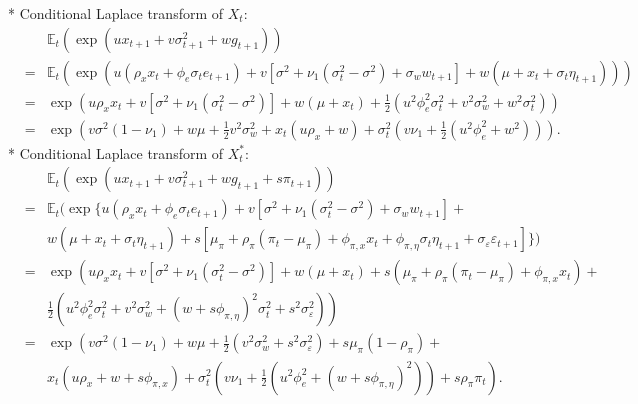 	* Conditional Laplace transform of $X_t$:\hyperlink{slide:BYaffine}{}
	\begin{eqnarray*}
	&& \mathbb{E}_t(\exp(u x_{t+1} + v \sigma^2_{t+1} + w g_{t+1}))\\
	&=& \mathbb{E}_t(\exp(u (\rho_x x_t + \phi_e \sigma_t e_{t+1}) + v [\sigma^2 + \nu_1(\sigma^2_t -\sigma^2) + \sigma_w w_{t+1}] + w (\mu + x_t + \sigma_t \eta_{t+1})))\\
	&=& \exp\left(u \rho_x x_t + v [\sigma^2 + \nu_1(\sigma^2_t -\sigma^2)] + w (\mu + x_t) + \frac{1}{2}(u^2 \phi_e^2 \sigma_t^2+v^2 \sigma_w^2 + w^2 \sigma_t^2) \right)\\
	&=& \exp\left(
	v \sigma^2 (1 - \nu_1) + w \mu + \frac{1}{2}v^2 \sigma_w^2 + x_t(u \rho_x +  w) + \sigma_t^2\left(v \nu_1+ \frac{1}{2}(u^2 \phi_e^2 + w^2)\right)
	\right).
	\end{eqnarray*}
	* Conditional Laplace transform of $X_t^*$:\hyperlink{slide:BYaugment}{}
	\begin{eqnarray*}
	&& \mathbb{E}_t(\exp(u x_{t+1} + v \sigma^2_{t+1} + w g_{t+1} + s \pi_{t+1}))\\
	&=& \mathbb{E}_t(\exp\{u (\rho_x x_t + \phi_e \sigma_t e_{t+1}) + v [\sigma^2 + \nu_1(\sigma^2_t -\sigma^2) + \sigma_w w_{t+1}] + \\
	&& w (\mu + x_t + \sigma_t \eta_{t+1}) +
	s [ \mu_\pi + \rho_{\pi} (\pi_{t} - \mu_\pi) + \phi_{\pi,x} x_{t} + \phi_{\pi,\eta} \sigma_t \eta_{t+1} + \sigma_\varepsilon \varepsilon_{t+1}]\})\\
	&=& \exp\left(u \rho_x x_t + v [\sigma^2 + \nu_1(\sigma^2_t -\sigma^2)] + w (\mu + x_t) + s ( \mu_\pi + \rho_{\pi} (\pi_{t} - \mu_\pi) + \phi_{\pi,x} x_{t}) +  \right. \\
	&& \left. \frac{1}{2}\left(u^2 \phi_e^2 \sigma_t^2+v^2 \sigma_w^2 + (w+s \phi_{\pi,\eta})^2 \sigma_t^2 + s^2 \sigma_\varepsilon^2\right) \right)\\
	&=& \exp\left(
	v \sigma^2 (1 - \nu_1) + w \mu + \frac{1}{2}\left(v^2 \sigma_w^2+s^2 \sigma_\varepsilon^2\right) +
	s \mu_\pi (1 - \rho_\pi) + \right. \\
	&& \left. x_t(u \rho_x +  w + s\phi_{\pi,x}) + \sigma_t^2\left(v \nu_1+ \frac{1}{2}(u^2 \phi_e^2 + (w+s \phi_{\pi,\eta})^2)\right) + s \rho_\pi \pi_t
	\right).
	\end{eqnarray*}





\label{slide:unc_moments_X}


